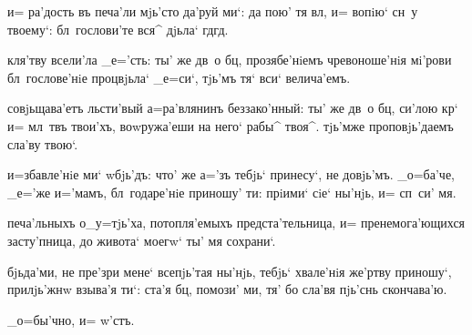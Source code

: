 и= ра'дость въ печа'ли мjь'сто да'руй ми`: да пою' тя 
вл, и= вопiю` сн~у твоему`: бл~гослови'те вся^ 
дjьла` гд гд.


кля'тву всели'ла _е='сть: ты' же дв~о бц, 
прозябе'нiемъ чревоноше'нiя мi'рови бл~гослове'нiе 
процвjьла` _е=си`, тjь'мъ тя` вси` велича'емъ.

совjьщава'етъ льсти'вый а=ра'влянинъ беззако'нный: ты' же 
дв~о бц, си'лою кр` и= мл~твъ твои'хъ, воwружа'еши 
на него` рабы^ твоя^. тjь'мже проповjь'даемъ сла'ву 
твою`.

и=збавле'нiе ми` w\т бjь'дъ: что' же а='зъ тебjь` 
принесу`, не довjь'мъ. _о=ба'че, _е='же и='мамъ, 
бл~годаре'нiе приношу' ти: прiими` сiе` ны'нjь, и= сп~си' 
мя.

печа'льныхъ о_у=тjь'ха, потопля'емыхъ предста'тельница, 
и= пренемога'ющихся засту'пница, до живота` моегw` ты' мя 
сохрани`.

бjьда'ми, не пре'зри мене` всепjь'тая ны'нjь, тебjь` 
хвале'нiя же'ртву приношу`, прилjь'жнw взыва'я ти`: ста'я 
бц, помози' ми, тя' бо сла'вя пjь'снь скончава'ю.

_о=бы'чно, и= w'стъ.%
